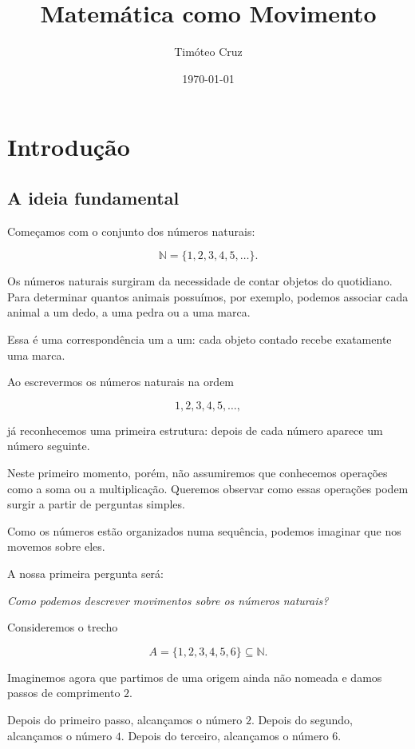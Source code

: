 \documentclass[12pt,a4paper]{article}
\title{Matemática como Movimento}
\author{Timóteo Cruz}
\date{\today}
\begin{document}
\maketitle

\tableofcontents
\newpage

\section{Introdução}

\subsection{A ideia fundamental}

Começamos com o conjunto dos números naturais:

\[
    \mathbb{N}=\{1,2,3,4,5,\ldots\}.
\]

Os números naturais surgiram da necessidade de contar objetos do
quotidiano. Para determinar quantos animais possuímos, por exemplo,
podemos associar cada animal a um dedo, a uma pedra ou a uma marca.

Essa é uma correspondência um a um: cada objeto contado recebe
exatamente uma marca.

Ao escrevermos os números naturais na ordem

\[
    1,2,3,4,5,\ldots,
\]

já reconhecemos uma primeira estrutura: depois de cada número aparece
um número seguinte.

Neste primeiro momento, porém, não assumiremos que conhecemos operações
como a soma ou a multiplicação. Queremos observar como essas operações
podem surgir a partir de perguntas simples.

Como os números estão organizados numa sequência, podemos imaginar que
nos movemos sobre eles.

A nossa primeira pergunta será:

\begin{center}
    \emph{Como podemos descrever movimentos sobre os números naturais?}
\end{center}

Consideremos o trecho

\[
    A=\{1,2,3,4,5,6\}\subseteq\mathbb{N}.
\]

Imaginemos agora que partimos de uma origem ainda não nomeada e damos
passos de comprimento \(2\).

Depois do primeiro passo, alcançamos o número \(2\). Depois do segundo,
alcançamos o número \(4\). Depois do terceiro, alcançamos o número \(6\).
\end{document}
